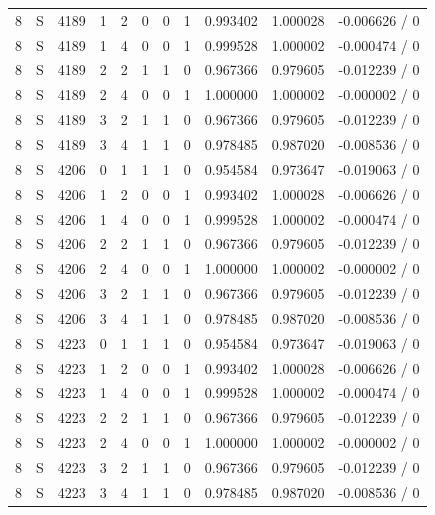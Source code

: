 \begin{longtable}{@{}rlrrlrrrrrr@{}}
8 & S & 4189 & 1 & 2 & 0 & 0 & 1 & 0.993402 & 1.000028 & -0.006626 / 0 \\
8 & S & 4189 & 1 & 4 & 0 & 0 & 1 & 0.999528 & 1.000002 & -0.000474 / 0 \\
8 & S & 4189 & 2 & 2 & 1 & 1 & 0 & 0.967366 & 0.979605 & -0.012239 / 0 \\
8 & S & 4189 & 2 & 4 & 0 & 0 & 1 & 1.000000 & 1.000002 & -0.000002 / 0 \\
8 & S & 4189 & 3 & 2 & 1 & 1 & 0 & 0.967366 & 0.979605 & -0.012239 / 0 \\
8 & S & 4189 & 3 & 4 & 1 & 1 & 0 & 0.978485 & 0.987020 & -0.008536 / 0 \\
8 & S & 4206 & 0 & 1 & 1 & 1 & 0 & 0.954584 & 0.973647 & -0.019063 / 0 \\
8 & S & 4206 & 1 & 2 & 0 & 0 & 1 & 0.993402 & 1.000028 & -0.006626 / 0 \\
8 & S & 4206 & 1 & 4 & 0 & 0 & 1 & 0.999528 & 1.000002 & -0.000474 / 0 \\
8 & S & 4206 & 2 & 2 & 1 & 1 & 0 & 0.967366 & 0.979605 & -0.012239 / 0 \\
8 & S & 4206 & 2 & 4 & 0 & 0 & 1 & 1.000000 & 1.000002 & -0.000002 / 0 \\
8 & S & 4206 & 3 & 2 & 1 & 1 & 0 & 0.967366 & 0.979605 & -0.012239 / 0 \\
8 & S & 4206 & 3 & 4 & 1 & 1 & 0 & 0.978485 & 0.987020 & -0.008536 / 0 \\
8 & S & 4223 & 0 & 1 & 1 & 1 & 0 & 0.954584 & 0.973647 & -0.019063 / 0 \\
8 & S & 4223 & 1 & 2 & 0 & 0 & 1 & 0.993402 & 1.000028 & -0.006626 / 0 \\
8 & S & 4223 & 1 & 4 & 0 & 0 & 1 & 0.999528 & 1.000002 & -0.000474 / 0 \\
8 & S & 4223 & 2 & 2 & 1 & 1 & 0 & 0.967366 & 0.979605 & -0.012239 / 0 \\
8 & S & 4223 & 2 & 4 & 0 & 0 & 1 & 1.000000 & 1.000002 & -0.000002 / 0 \\
8 & S & 4223 & 3 & 2 & 1 & 1 & 0 & 0.967366 & 0.979605 & -0.012239 / 0 \\
8 & S & 4223 & 3 & 4 & 1 & 1 & 0 & 0.978485 & 0.987020 & -0.008536 / 0 \\
\end{longtable}
